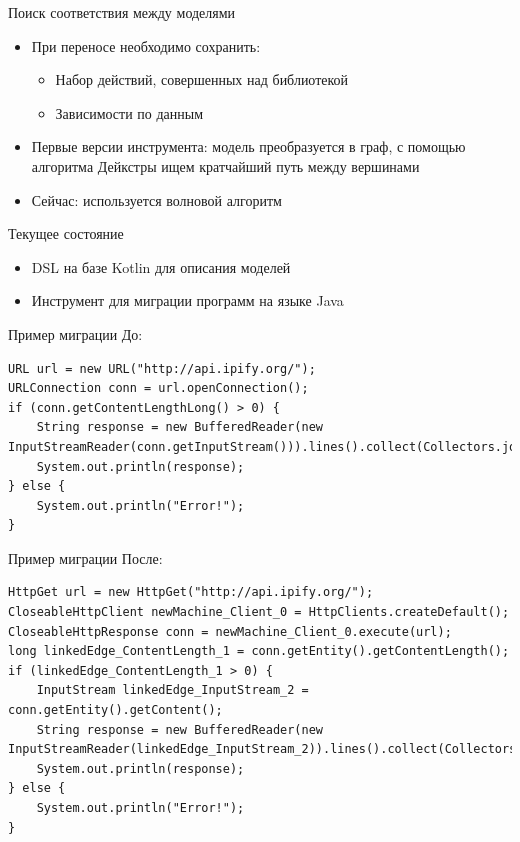 \documentclass[12pt]{beamer}
\begin{document}
\begin{frame}[fragile]{Поиск соответствия между моделями}
  \begin{mybox}[]
  \begin{itemize}
  	\item При переносе необходимо сохранить:
  	  \begin{itemize}
  	  	\item Набор действий, совершенных над библиотекой
  	  	\item Зависимости по данным
  	  \end{itemize}
  	\item Первые версии инструмента: модель преобразуется в граф, с помощью алгоритма Дейкстры ищем кратчайший путь между вершинами
  	\item Сейчас: используется волновой алгоритм
  \end{itemize}
  \end{mybox}
\end{frame}

\begin{frame}[fragile]{Текущее состояние}
  \begin{mybox}[]
  \begin{itemize}
  	\item DSL на базе Kotlin для описания моделей
  	\item Инструмент для миграции программ на языке Java
  \end{itemize}
  \end{mybox}
\end{frame}

\begin{frame}[fragile]{Пример миграции}
До:
\begin{lstlisting}
URL url = new URL("http://api.ipify.org/");
URLConnection conn = url.openConnection();
if (conn.getContentLengthLong() > 0) {
    String response = new BufferedReader(new InputStreamReader(conn.getInputStream())).lines().collect(Collectors.joining("\n"));
    System.out.println(response);
} else {
    System.out.println("Error!");
}
\end{lstlisting}
\end{frame}

\begin{frame}[fragile]{Пример миграции}
После:
\begin{lstlisting}
HttpGet url = new HttpGet("http://api.ipify.org/");
CloseableHttpClient newMachine_Client_0 = HttpClients.createDefault();
CloseableHttpResponse conn = newMachine_Client_0.execute(url);
long linkedEdge_ContentLength_1 = conn.getEntity().getContentLength();
if (linkedEdge_ContentLength_1 > 0) {
    InputStream linkedEdge_InputStream_2 = conn.getEntity().getContent();
    String response = new BufferedReader(new InputStreamReader(linkedEdge_InputStream_2)).lines().collect(Collectors.joining("\n"));
    System.out.println(response);
} else {
    System.out.println("Error!");
}
\end{lstlisting}
\end{frame}
\end{document}
